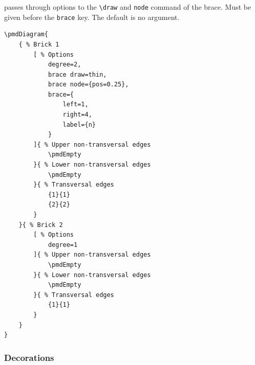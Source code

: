 \documentclass{ltxdoc}
\begin{document}
passes through options to the \verb`\draw` and \verb`node` command of the brace. Must be given before the \texttt{brace} key. The default is no argument.
\begin{center}
    \begin{minipage}{\dimexpr0.85\textwidth-2\fboxrule-2\fboxsep\relax}
        \begin{minipage}[c]{0.4\linewidth}
\begin{verbatim}
\pmdDiagram{
    { % Brick 1
        [ % Options
            degree=2,
            brace draw=thin,
            brace node={pos=0.25},
            brace={
                left=1,
                right=4,
                label={n}
            }
        ]{ % Upper non-transversal edges
            \pmdEmpty
        }{ % Lower non-transversal edges
            \pmdEmpty
        }{ % Transversal edges
            {1}{1}
            {2}{2}
        }
    }{ % Brick 2
        [ % Options
            degree=1
        ]{ % Upper non-transversal edges
            \pmdEmpty
        }{ % Lower non-transversal edges
            \pmdEmpty
        }{ % Transversal edges
            {1}{1}
        }
    }
}
\end{verbatim}
        \end{minipage}
        \hfill
        \begin{minipage}[c]{0.4\linewidth}
        \end{minipage}
    \end{minipage}%
\end{center}
\begin{center}
\end{center}

\subsubsection{Decorations}
\end{document}
